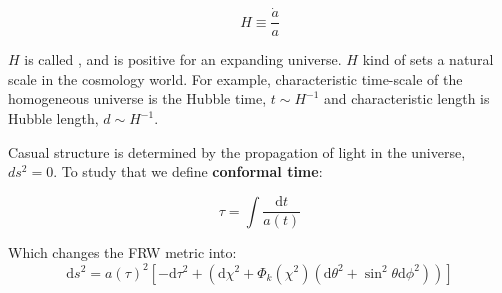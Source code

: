 \begin{equation}
H \equiv \frac{\dot{a}}{a}
\end{equation}

$H$ is called , and is positive for an expanding universe. $H$ kind of sets a natural scale in the cosmology world. For example, characteristic time-scale of the homogeneous universe is the Hubble time, $t \sim H^{-1}$ and characteristic length is Hubble length, $d \sim H^{-1}$.


Casual structure is determined by the propagation of light in the universe, $ds^2 = 0$. To study that we define \textbf{conformal time}: 

\begin{equation}
\tau=\int \frac{\mathrm{d} t}{a(t)}
\end{equation}

Which changes the FRW metric into:
\begin{equation}
\mathrm{d} s^{2}=a(\tau)^{2}\left[-\mathrm{d} \tau^{2}+\left(\mathrm{d} \chi^{2}+\Phi_{k}\left(\chi^{2}\right)\left(\mathrm{d} \theta^{2}+\sin ^{2} \theta \mathrm{d} \phi^{2}\right)\right)\right]
\end{equation}

